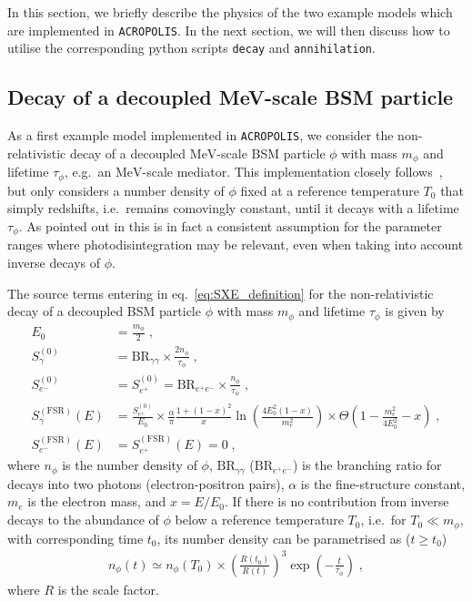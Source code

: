 \documentclass[11pt,a4paper]{article}
\newcommand{\eqsp}{\;}
\begin{document}
In this section, we briefly describe the physics of the two example models which are implemented in \texttt{ACROPOLIS}. In the next section, we will then discuss how to utilise the corresponding python scripts
\texttt{decay} and \texttt{annihilation}.

\subsection{Decay of a decoupled MeV-scale BSM particle}
\label{sec:decay_model}
As a first example model implemented in \texttt{ACROPOLIS}, we consider the non-relativistic decay of a decoupled $\mathrm{MeV}$-scale BSM particle $\phi$ with mass $m_\phi$ and lifetime $\tau_\phi$, e.g.\ an $\mathrm{MeV}$-scale mediator. This implementation closely follows~\cite{Hufnagel:2018bjp,em-decay}, but only considers a number density of $\phi$ fixed at a reference temperature $T_0$ that simply redshifts, i.e.\ remains comovingly constant, until it decays with a lifetime $\tau_\phi$. As pointed out in \cite{em-decay} this is in fact a consistent assumption for the parameter ranges where photodisintegration may be relevant, even when taking into account inverse decays of $\phi$.

The source terms entering in eq.~\eqref{eq:SXE_definition} for the non-relativistic decay of a decoupled BSM particle $\phi$ with mass $m_\phi$ and lifetime $\tau_\phi$ is given by~\cite{Hufnagel:2018bjp,Forestell:2018txr,Mardon:2009rc,Birkedal:2005ep}
\begin{align}
E_0 &= \frac{m_\phi}{2}\eqsp, \\
S_\gamma^{(0)} &= \text{BR}_{\gamma \gamma} \times \frac{2 n_\phi}{\tau_\phi}\eqsp,\label{eq:sa_decay} \\
S_{e^-}^{(0)} &= S_{e^+}^{(0)} = \text{BR}_{e^+ e^-} \times \frac{n_\phi}{\tau_\phi}\eqsp,\label{eq:se_decay} \\
S_\gamma^{(\text{FSR})} (E) &= \frac{S^{(0)}_{e^\pm}}{E_0} \times \frac{\alpha}{\pi} \frac{1 + (1-x)^2}{x} \ln \left( \frac{4 E_0^2 (1-x)}{m_e^2} \right) \times \Theta \left( 1 - \frac{m_e^2}{4 E_0^2} - x \right)\eqsp, \label{eq:safsr_decay}\\
S_{e^-}^{(\text{FSR})} (E) &= S_{e^+}^{(\text{FSR})} (E) = 0\eqsp,
\end{align}
where $n_\phi$ is the number density of $\phi$, $\text{BR}_{\gamma \gamma}$ ($\text{BR}_{e^+ e^-}$) is the branching ratio for decays into two photons (electron-positron pairs), $\alpha$ is the fine-structure constant, $m_e$ is the electron mass, and $x = E/E_0$. If there is no contribution from inverse decays to the abundance of $\phi$ below a reference temperature $T_0$, i.e.\ for $T_0 \ll m_\phi$, with corresponding time $t_0$, its number density can be parametrised as ($t \geq t_0$)
\begin{align}
n_\phi (t) \simeq n_\phi (T_0) \times \left( \frac{R(t_0)}{R(t)} \right)^3 \exp \left( - \frac{t}{\tau_\phi} \right)\eqsp,
\label{eq:n_decay}
\end{align}
where $R$ is the scale factor.
\end{document}
